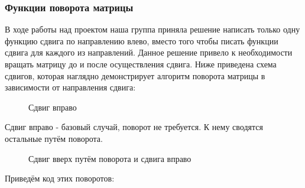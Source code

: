 \documentclass[a4paper,12pt]{article}
\begin{document}
\subsubsection{Функции поворота матрицы}
В ходе работы над проектом наша группа приняла решение написать только одну функцию сдвига по направлению влево, вместо того чтобы писать функции сдвига для каждого из направлений. Данное решение привело к необходимости вращать матрицу до и после осуществления сдвига. Ниже приведена схема сдвигов, которая наглядно демонстрирует алгоритм поворота матрицы в зависимости от направления сдвига:
\begin{figure}[H]
\caption{Сдвиг вправо}
\label{move}
\end{figure}
Сдвиг вправо - базовый случай, поворот не требуется. К нему сводятся остальные путём поворота.
\begin{figure}[H]
\caption{Сдвиг вверх путём поворота и сдвига вправо}
\label{rotate}
\end{figure}
Приведём код этих поворотов:
\end{document}
